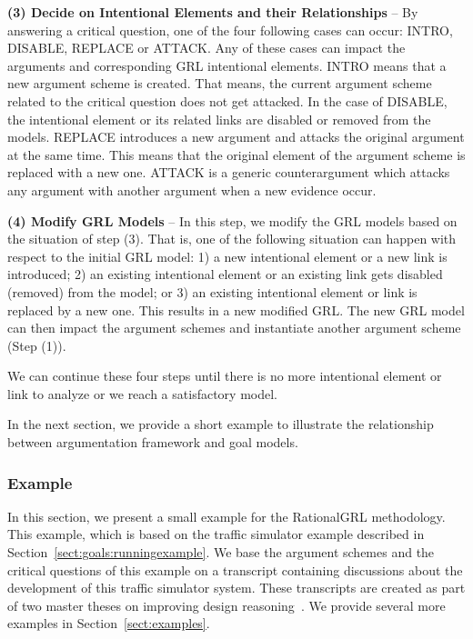 \textbf{(3) Decide on Intentional Elements and their Relationships} -- By answering a critical question, one of the four following cases can occur: \textsf{INTRO}, \textsf{DISABLE}, \textsf{REPLACE} or \textsf{ATTACK}.  Any of these cases can  impact the arguments and corresponding GRL intentional elements.  \textsf{INTRO} means that 
a new argument scheme is created. That means, the current argument scheme related to the critical question does not get attacked.  In the case of \textsf{DISABLE}, the intentional element or its related links are disabled or removed from the models. \textsf{REPLACE} introduces a new argument and attacks the original argument at the same time. This means that the original element of the argument scheme is replaced with a new one.   \textsf{ATTACK} is a generic counterargument which attacks any argument with another argument when a new evidence occur.  

\textbf{(4) Modify GRL Models} -- In this step, we modify the GRL models based on the situation of step (3). That is, one of the following situation can happen with respect to the initial GRL model: 1) a new intentional element or a new link is introduced; 2) an existing intentional element or an existing link gets disabled (removed) from the model; or 3) an existing intentional element or link is replaced by a new one. This results in a new modified GRL. The new GRL model can then impact the argument schemes and instantiate another argument scheme (Step (1)).   

We can continue these four steps until there is no more intentional element or link to analyze or we reach a satisfactory model. 

In the next section, we provide a short example to illustrate the relationship between argumentation framework and goal models.  


\subsubsection*{Example} 
\label{sect:methodology-example}

In this section, we present a small example for the RationalGRL methodology. This example, which is based on the traffic simulator example described in Section~\ref{sect:goals:runningexample}. We base the argument schemes and the critical questions of this example on a transcript containing discussions about the development of this traffic simulator system. These transcripts are created as part of two master theses on improving design reasoning~\cite{masterthesis1,masterthesis2}. We provide several more examples in Section~\ref{sect:examples}.


